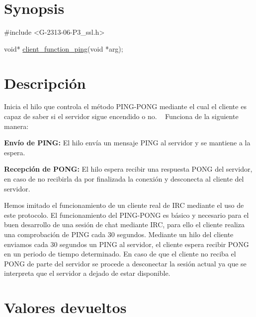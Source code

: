\hypertarget{client_function_ping_synopsis_1}{}\section{Synopsis}\label{client_function_ping_synopsis_1}

\begin{DoxyCode}
\textcolor{preprocessor}{#include <G-2313-06-P3\_ssl.h>}

\textcolor{keywordtype}{void}* \hyperlink{G-2313-06-P2__client_8h_a7297f848d5b0bd4990857d03cf3111e4}{client\_function\_ping}(\textcolor{keywordtype}{void} *arg);
\end{DoxyCode}
 \hypertarget{client_function_ping_descripcion_1}{}\section{Descripción}\label{client_function_ping_descripcion_1}
Inicia el hilo que controla el método P\+I\+N\+G-\/\+P\+O\+NG mediante el cual el cliente es capaz de saber si el servidor sigue encendido o no. ~\newline
Funciona de la siguiente manera\+: 
\begin{DoxyItemize}
\item {\bfseries Envío de P\+I\+NG\+:} El hilo envía un mensaje P\+I\+NG al servidor y se mantiene a la espera. 
\item {\bfseries Recepción de P\+O\+NG\+:} El hilo espera recibir una respuesta P\+O\+NG del servidor, en caso de no recibirla da por finalizada la conexión y desconecta al cliente del servidor. 
\end{DoxyItemize}Hemos imitado el funcionamiento de un cliente real de I\+RC mediante el uso de este protocolo. El funcionamiento del P\+I\+N\+G-\/\+P\+O\+NG es básico y necesario para el buen desarrollo de una sesión de chat mediante I\+RC, para ello el cliente realiza una comprobación de P\+I\+NG cada 30 segundos. Mediante un hilo del cliente enviamos cada 30 segundos un P\+I\+NG al servidor, el cliente espera recibir P\+O\+NG en un periodo de tiempo determinado. En caso de que el cliente no reciba el P\+O\+NG de parte del servidor se procede a desconectar la sesión actual ya que se interpreta que el servidor a dejado de estar disponible. \hypertarget{client_function_ping_return_1}{}\section{Valores devueltos}\label{client_function_ping_return_1}

